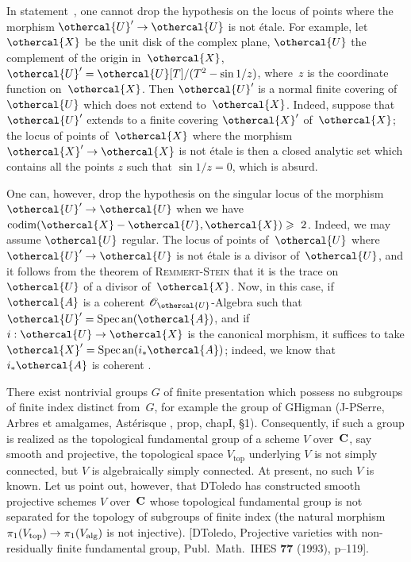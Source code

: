 \begin{remark}
\label{XII.5.5}
In statement~, one cannot drop
the hypothesis on the locus of points where the morphism
$\othercal{U}'\to\othercal{U}$ is not \'etale. For example, let
$\othercal{X}$ be the unit disk of the complex plane, $\othercal{U}$ the
complement of the origin in~$\othercal{X}$,
$\othercal{U}'=\othercal{U}[T]/(T^2-\sin 1/z)$, where~$z$ is the
coordinate function on~$\othercal{X}$. Then $\othercal{U}'$ is a normal
finite covering of~$\othercal{U}$ which does not extend
to~$\othercal{X}$. Indeed, suppose that $\othercal{U}'$ extends to a
finite covering $\othercal{X}'$ of~$\othercal{X}$; the locus of points
of~$\othercal{X}$ where the morphism $\othercal{X}'\to\othercal{X}$ is not
\'etale is then a closed analytic set which contains all the
points $z$ such that $\sin 1/z=0$, which is absurd.

One can, however, drop the hypothesis on the singular locus of the
morphism $\othercal{U}'\to\othercal{U}$ when we have
$\codim(\othercal{X}-\othercal{U},\othercal{X})\geq~2$. Indeed, we may assume
$\othercal{U}$ regular. The locus of points of~$\othercal{U}$ where
$\othercal{U}'\to\othercal{U}$ is not \'etale is a divisor
of~$\othercal{U}$, and it follows from the theorem of \textsc{Remmert}-\textsc{Stein}
\cite[th]{XII.9} that it is
the trace on~$\othercal{U}$ of a divisor of~$\othercal{X}$. Now, in this case,
if $\othercal{A}$ is a coherent $\cal{O}_{\othercal{U}}$-Algebra
such that $\othercal{U}'=\Spec \an(\othercal{A})$, and if $i:\othercal{U}\to\othercal{X}$
is the canonical morphism, it suffices to take
$\othercal{X}'=\Spec\an(i_*\othercal{A})$; indeed, we know that $i_*\othercal{A}$
is coherent \cite[ th]{XII.11}.
\end{remark}

\begin{remarkMR}
\label{XII.5.6}
There exist nontrivial groups $G$ of finite presentation
which possess no subgroups of finite index
distinct from~$G$, for example the group of G\ptbl Higman (\cf J-P\ptbl Serre, Arbres et amalgames, Ast\'erisque , prop, chap\ptbl I, \S 1).
Consequently, if such a group is realized as the topological fundamental
group of a scheme $V$ over~$\mathbf{C}$, say smooth and
projective, the topological space $V_{\mathrm{top}}$ underlying $V$ is not
simply connected, but $V$ is algebraically simply connected.
At present, no such $V$ is known. Let us point out, however,
that D\ptbl Toledo has constructed smooth projective schemes $V$ over~$\mathbf{C}$ whose topological fundamental group is not separated
for the topology of subgroups of finite index (the natural morphism
$\pi_1(V_{\mathrm{top}})\to\pi_1(V_{\alg})$ is not injective). [D\ptbl Toledo, Projective varieties with non-residually finite fundamental group, Publ.\ Math.\ IHES \textbf{77} (1993), p--119].
\end{remarkMR}

